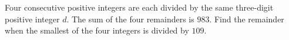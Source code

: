 Four consecutive positive integers are each divided by the same three-digit positive integer $d$. The sum of the four remainders is $983$. Find the remainder when the smallest of the four integers is divided by $109$.
